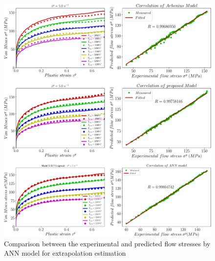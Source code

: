 \documentclass[twoside,english,1p,final,sort&compress]{elsarticle}
\theoremstyle{plain}
\begin{document}
\begin{figure}[!ht]
\centering
\includegraphics[width=1.02\columnwidth]
{newFigures/exCombinaison2}
\caption{Comparison between the experimental and predicted flow stresses by ANN model for extrapolation estimation}
\label{fig:exCombinaison2}
\end{figure}
\FloatBarrier

\end{document}
